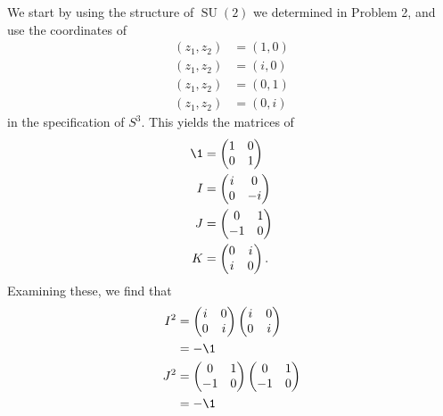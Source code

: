 \documentclass[10pt]{mypackage}
\begin{document}
\begin{solution}
\begin{enumerate}[(a)]
\begin{itemize}
      \end{itemize}
      We start by using the structure of $ \operatorname{SU}(2) $ we determined in Problem 2, and use the coordinates of
      \begin{align*}
        \left( z_1,z_2 \right) &= \left( 1,0 \right)\\
        \left( z_1,z_2 \right) &= \left( i,0 \right)\\
        \left( z_1,z_2 \right) &= \left( 0,1 \right)\\
        \left( z_1,z_2 \right) &= \left( 0,i \right)
      \end{align*}
      in the specification of $ S^{3} $. This yields the matrices of
      \begin{align*}
        \1 &= \begin{pmatrix}1 & 0 \\ 0 & 1\end{pmatrix}\\
        I &= \begin{pmatrix}i & 0 \\ 0 & -i\end{pmatrix}\\
        J &= \begin{pmatrix}0 & 1 \\ -1 & 0\end{pmatrix}\\
        K &= \begin{pmatrix}0 & i \\ i & 0\end{pmatrix}.
      \end{align*}
      Examining these, we find that
      \begin{align*}
        I^2 &= \begin{pmatrix}i & 0 \\ 0 & i\end{pmatrix} \begin{pmatrix}i & 0 \\ 0 & i\end{pmatrix}\\
            &= -\1\\
        J^2 &= \begin{pmatrix}0 & 1 \\ -1 & 0\end{pmatrix} \begin{pmatrix}0 & 1 \\ -1 & 0\end{pmatrix}\\
            &= -\1\\

\end{align*}
\end{enumerate}
\end{solution}
\end{document}
